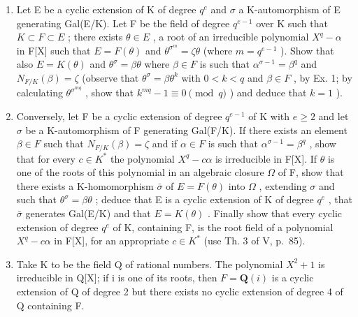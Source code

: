 \begin{enumerate}
\def\labelenumi{\alph{enumi})}
\item
  Let E be a cyclic extension of K of degree \(q^e\) and \(\sigma\) a K-automorphism of E generating Gal(E/K). Let F be the field of degree \(q^{e-1}\) over K such that \(K \subset F \subset E\) ; there exists \(\theta \in E\) , a root of an irreducible polynomial \(X^q - \alpha\) in F{[}X{]} such that \(E = F(\theta)\) and \(\theta^{\sigma^m} = \zeta\theta\) (where \(m = q^{e-1}\) ). Show that also \(E = K(\theta)\) and \(\theta^\sigma = \beta\theta\) where \(\beta \in F\) is such that \(\alpha^{\sigma-1} = \beta^q\) and \(N_{F/K}(\beta) = \zeta\) (observe that \(\theta^\sigma = \beta\theta^k\) with \(0 < k < q\) and \(\beta \in F\) , by Ex. 1; by calculating \(\theta^{\sigma^{mq}}\) , show that \(k^{mq} - 1 \equiv 0 \pmod{q}\) ) and deduce that \(k = 1\) ).
\item
  Conversely, let F be a cyclic extension of degree \(q^{e-1}\) of K with \(e \geqslant 2\) and let \(\sigma\) be a K-automorphism of F generating Gal(F/K). If there exists an element \(\beta \in F\) such that \(N_{F/K}(\beta) = \zeta\) and if \(\alpha \in F\) is such that \(\alpha^{\sigma-1} = \beta^q\) , show that for every \(c \in K^*\) the polynomial \(X^q - c\alpha\) is irreducible in F{[}X{]}. If \(\theta\) is one of the roots of this polynomial in an algebraic closure \(\Omega\) of F, show that there exists a K-homomorphism \(\bar{\sigma}\) of \(E = F(\theta)\) into \(\Omega\) , extending \(\sigma\) and such that \(\theta^{\sigma} = \beta\theta\) ; deduce that E is a cyclic extension of K of degree \(q^e\) , that \(\bar{\sigma}\) generates Gal(E/K) and that \(E = K(\theta)\) . Finally show that every cyclic extension of degree \(q^e\) of K, containing F, is the root field of a polynomial \(X^q - c\alpha\) in F{[}X{]}, for an appropriate \(c \in K^*\) (use Th. 3 of V, p.~85).
\item
  Take K to be the field Q of rational numbers. The polynomial \(X^{2} + 1\) is irreducible in Q{[}X{]}; if i is one of its roots, then \(F = \mathbf{Q}(i)\) is a cyclic extension of Q of degree 2 but there exists no cyclic extension of degree 4 of Q containing F.
\end{enumerate}

